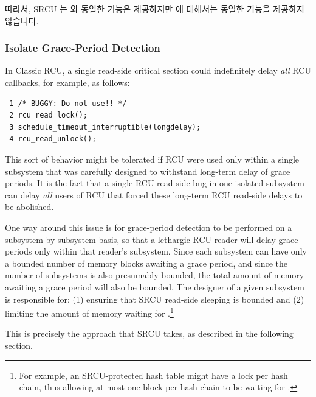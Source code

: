따라서, SRCU 는  와 동일한 기능은 제공하지만
 에 대해서는 동일한 기능을 제공하지 않습니다.

\subsubsection{Isolate Grace-Period Detection}
\label{sec:app:rcuimpl:Isolate Grace-Period Detection}

In Classic RCU, a single read-side critical section could indefinitely
delay \emph{all} RCU callbacks, for example, as follows:

\vspace{5pt}
\begin{minipage}[t]{\columnwidth}
\scriptsize
\begin{verbatim}
 1 /* BUGGY: Do not use!! */
 2 rcu_read_lock();
 3 schedule_timeout_interruptible(longdelay);
 4 rcu_read_unlock();
\end{verbatim}
\end{minipage}
\vspace{5pt}

This sort of behavior might be tolerated if RCU were used only within
a single subsystem that was carefully designed to withstand long-term
delay of grace periods.
It is the fact that a single RCU read-side bug in one isolated subsystem can
delay \emph{all} users of RCU that forced these long-term RCU read-side
delays to be abolished.

One way around this issue is for grace-period detection to be performed
on a subsystem-by-subsystem basis, so that a lethargic RCU reader will
delay grace periods only within that reader's subsystem.
Since each subsystem can have only a bounded number of memory blocks
awaiting a grace period, and since the number of subsystems is also
presumably bounded, the total amount of memory awaiting a grace period
will also be bounded.
The designer of a given subsystem is responsible for: (1) ensuring that
SRCU read-side sleeping is bounded and (2) limiting the amount of memory
waiting for .\footnote{
	For example, an SRCU-protected hash table might have a lock
	per hash chain, thus allowing at most one block per hash
	chain to be waiting for .}

This is precisely the approach that SRCU takes, as described in the
following section.

